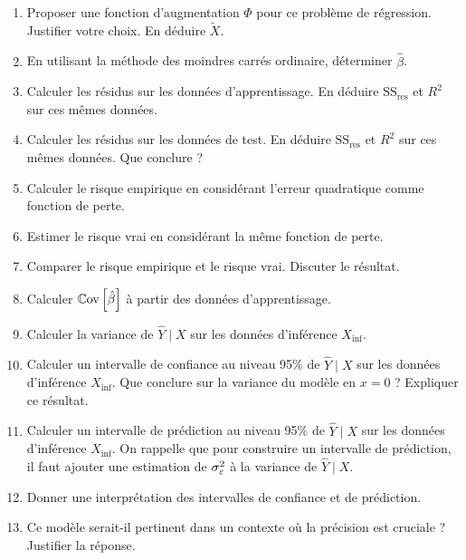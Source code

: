 \documentclass[solutions]{../exercices}
\begin{document}
\begin{exercice}
		\begin{enumerate}
			\item Proposer une fonction d'augmentation $\Phi$ pour ce problème de régression. Justifier votre choix. En déduire $\tilde{X}$.
			\item En utilisant la méthode des moindres carrés ordinaire, déterminer $\hat{\beta}$.
			\item Calculer les résidus sur les données d'apprentissage. En déduire $\text{SS}_{\text{res}}$ et $R^2$ sur ces mêmes données.
			\item Calculer les résidus sur les données de test. En déduire $\text{SS}_{\text{res}}$ et $R^2$ sur ces mêmes données. Que conclure ?
			\item Calculer le risque empirique en considérant l'erreur quadratique comme fonction de perte.
			\item Estimer le risque vrai en considérant la même fonction de perte.
			\item Comparer le risque empirique et le risque vrai. Discuter le résultat.
			\item Calculer $\mathbb{C}\mathrm{ov} \left[\hat{\beta}\right]$ à partir des données d'apprentissage.
			\item Calculer la variance de $\hat{Y} \mid X$ sur les données d'inférence $X_{\text{inf}}$.
			\item Calculer un intervalle de confiance au niveau 95\% de $\hat{Y} \mid X$ sur les données d'inférence $X_{\text{inf}}$. Que conclure sur la variance du modèle en $x = 0$ ? Expliquer ce résultat.
			\item Calculer un intervalle de prédiction au niveau 95\% de $\hat{Y} \mid X$ sur les données d'inférence $X_{\text{inf}}$. On rappelle que pour construire un intervalle de prédiction, il faut ajouter une estimation de $\sigma_{\varepsilon}^2$ à la variance de $\hat{Y} \mid X$.
			\item Donner une interprétation des intervalles de confiance et de prédiction.
			\item Ce modèle serait-il pertinent dans un contexte où la précision est cruciale ? Justifier la réponse.
		\end{enumerate}
	\end{exercice}
	
\end{document}
